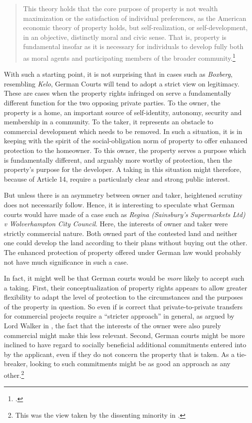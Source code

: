\documentclass[12pt,a4paper]{book} %
\begin{document}
\begin{quote}
This theory holds that the core purpose of property is not wealth maximization or the satisfaction of individual preferences, as the American economic theory of property holds, but self-realization, or self-development, in an objective, distinctly moral and civic sense. That is, property is fundamental insofar as it is necessary for individuals to develop fully both
as moral agents and participating members of the broader community.\footcite[745]{alexander03}
\end{quote}

With such a starting point, it is not surprising that in cases such as {\it Boxberg}, resembling {\it Kelo}, German Courts will tend to adopt a strict view on legitimacy. These are cases when the property rights infringed on serve a fundamentally different function for the two opposing private parties. To the owner, the property is a home, an important source of self-identity, autonomy, security and membership in a community. To the taker, it represents an obstacle to commercial development which needs to be removed. In such a situation, it is in keeping with the spirit of the social-obligation norm of property to offer enhanced protection to the homeowner. To this owner, the property serves a purpose which is fundamentally different, and arguably more worthy of protection, then the property's purpose for the developer. A taking in this situation might therefore, because of Article 14, require a particularly clear and strong public interest.

But unless there is an asymmetry between owner and taker, heightened scrutiny does not necessarily follow. Hence, it is interesting to speculate what German courts would have made of a case such as {\it Regina (Sainsbury’s Supermarkets Ltd) v Wolverhampton City Council}. Here, the interests of owner and taker were strictly commercial nature. Both owned part of the contested land and neither one could develop the land according to their plans without buying out the other. The enhanced protection of property offered under German law would probably not have much significance in such a case. 

In fact, it might well be that German courts would be {\it more} likely to accept such a taking. First, their conceptualization of property rights appears to allow greater flexibility to adapt the level of protection to the circumstances and the purposes of the property in question. So even if is correct that private-to-private transfers for commercial projects require a ``stricter approach'' in general, as argued by Lord Walker in \textcite{sainsbury10}, the fact that the interests of the owner were also purely commercial  might make this less relevant. Second, German courts might be more inclined to have regard to socially beneficial additional commitments entered into by the applicant, even if they do not concern the property that is taken. As a tie-breaker, looking to such commitments might be as good an approach as any other.\footnote{This was the view taken by the dissenting minority in \textcite{sainsbury10}.}
\end{document}
